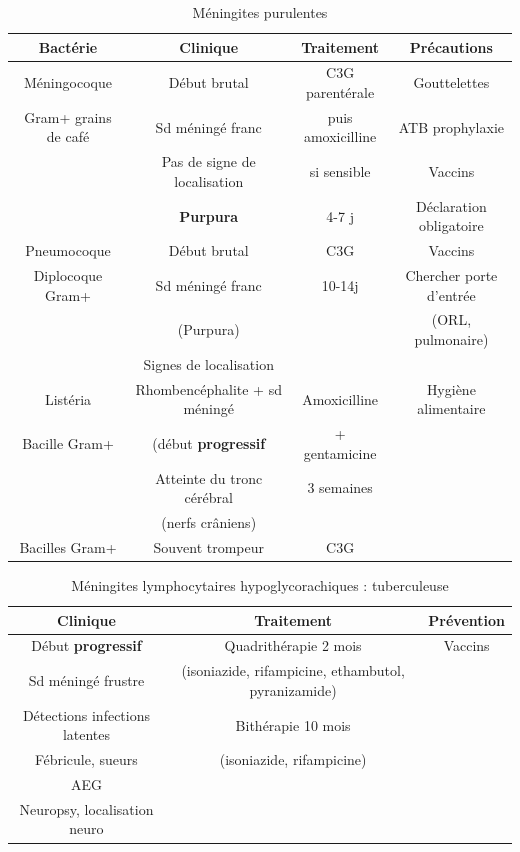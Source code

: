 \begin{table}[htpb]
  \centering
  \caption{Méningites purulentes}
  \begin{tabular}{*{4}{c}}
    \toprule
    Bactérie & Clinique & Traitement & Précautions \\
    \midrule
    Méningocoque  & Début brutal  & C3G parentérale  & Gouttelettes  \\
    Gram+ grains de café  & Sd méningé franc  & puis amoxicilline  & ATB
    prophylaxie \\
    & Pas de signe de localisation  & si sensible  & Vaccins  \\
    & \textbf{Purpura} & 4-7 j & Déclaration obligatoire \\
    \hline
    Pneumocoque  & Début brutal  & C3G  & Vaccins  \\
    Diplocoque Gram+ & Sd méningé franc  & 10-14j & Chercher porte d'entrée  \\
    & (Purpura)  & & (ORL, pulmonaire) \\
    & Signes de localisation & & \\
    \hline
    Listéria  & Rhombencéphalite + sd méningé  & Amoxicilline  & Hygiène alimentaire \\
    Bacille Gram+ & (début \textbf{progressif}  & + gentamicine  & \\
    & Atteinte du tronc cérébral  & 3 semaines & \\
    & (nerfs crâniens) & & \\
    \hline
    Bacilles Gram+ & Souvent trompeur & C3G & \\
    \bottomrule
  \end{tabular}
\end{table}

\begin{table}[htpb]
  \centering
  \caption{Méningites lymphocytaires hypoglycorachiques : tuberculeuse}
  \begin{tabular}{*{3}{c}}
    \toprule
    Clinique & Traitement & Prévention \\
    \midrule
    Début \textbf{progressif} & Quadrithérapie 2 mois & Vaccins \\
    Sd méningé frustre & (isoniazide, rifampicine, ethambutol, pyranizamide) & \\
    Détections infections latentes & Bithérapie 10 mois & \\ 
    Fébricule, sueurs &(isoniazide, rifampicine)  & \\
    AEG & & \\
    Neuropsy, localisation neuro & & \\
    \bottomrule
  \end{tabular}
\end{table}

